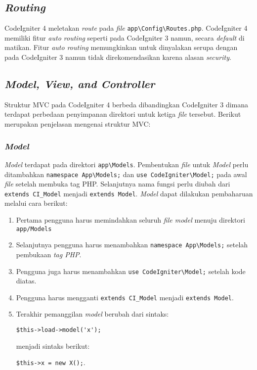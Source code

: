 \subsection{\textit{Routing}}

CodeIgniter 4 meletakan \textit{route} pada \textit{file} \verb|app\Config\Routes.php|. CodeIgniter 4 memiliki fitur \textit{auto routing} seperti pada CodeIgniter 3 namun, secara \textit{default} di matikan. Fitur \textit{auto routing} memungkinkan untuk dinyalakan serupa dengan pada CodeIgniter 3 namun tidak direkomendasikan karena alasan \textit{security}.
 
\subsection{\textit{Model, View, and Controller}}
 
Struktur MVC pada CodeIgniter 4 berbeda dibandingkan CodeIgniter 3 dimana terdapat perbedaan penyimpanan direktori untuk ketiga \textit{file} tersebut. Berikut merupakan penjelasan mengenai struktur MVC:

\subsubsection{\textit{Model}}
\textit{Model} terdapat pada direktori \verb|app\Models|. Pembentukan \textit{file} untuk \textit{Model} perlu ditambahkan \verb|namespace App\Models;| dan \verb|use CodeIgniter\Model;| pada awal \textit{file} setelah membuka tag PHP. Selanjutnya nama fungsi perlu diubah dari \verb|extends CI_Model| menjadi \verb|extends Model|. \textit{Model} dapat dilakukan pembaharuan melalui cara berikut:
\begin{enumerate}
\item Pertama pengguna harus memindahkan seluruh \textit{file model} menuju direktori \verb|app/Models|
\item Selanjutnya pengguna harus menambahkan \verb|namespace App\Models;| setelah pembukaan \textit{tag PHP}.
\item Pengguna juga harus menambahkan \verb|use CodeIgniter\Model;| setelah kode diatas.
\item Pengguna harus mengganti \verb|extends CI_Model| menjadi \verb|extends Model|.
\item Terakhir pemanggilan \textit{model} berubah dari sintaks: 
\begin{center}
	\verb|$this->load->model('x');|
\end{center} 
	menjadi sintaks berikut:
\begin{center}
	\verb|$this->x = new X();|.
\end{center}
\end{enumerate}
 
